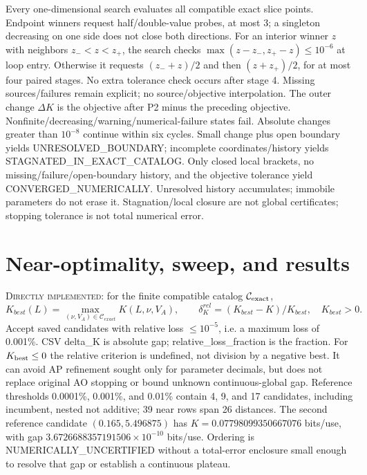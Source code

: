 \documentclass[11pt]{article}
\newcommand{\DI}{\textsc{Directly implemented}}
\begin{document}
Every one-dimensional search evaluates all compatible exact slice points.
Endpoint winners request half/double-value probes, at most 3;
a singleton decreasing on one side does not close both directions.
For an interior winner $z$ with neighbors $z_-<z<z_+$, the search checks
$\max(z-z_-,z_+-z)\le10^{-6}$ at loop entry.
Otherwise it requests $(z_-+z)/2$ and then $(z+z_+)/2$, for at most four paired stages.
No extra tolerance check occurs after stage 4.
Missing sources/failures remain explicit; no source/objective interpolation.
The outer change $\Delta K$ is the objective after P2 minus the preceding objective.
Nonfinite/decreasing/warning/numerical-failure states fail.
Absolute changes greater than $10^{-8}$ continue within six cycles.
Small change plus open boundary yields UNRESOLVED\_BOUNDARY;
incomplete coordinates/history yields STAGNATED\_IN\_EXACT\_CATALOG.
Only closed local brackets, no missing/failure/open-boundary history, and the objective
tolerance yield CONVERGED\_NUMERICALLY.
Unresolved history accumulates; immobile parameters do not erase it.
Stagnation/local closure are not global certificates; stopping tolerance is
not total numerical error.

\section{Near-optimality, sweep, and results}
\DI: for the finite compatible catalog $\mathcal C_{\rm exact}$,
\begin{equation}
K_{best}(L)=\max_{(\nu,V_A)\in\mathcal C_{exact}}K(L,\nu,V_A),\qquad
\delta_K^{rel}=(K_{best}-K)/K_{best},\quad K_{best}>0.
\end{equation}
Accept saved candidates with relative loss $\le10^{-5}$, i.e. a maximum loss of 0.001\%.
CSV delta\_K is absolute gap; relative\_loss\_fraction is the fraction.
For $K_{\rm best}\le0$ the relative criterion is undefined, not division by a negative best.
It can avoid AP refinement sought only for parameter decimals, but does not
replace original AO stopping or bound unknown continuous-global gap.
Reference thresholds 0.0001\%, 0.001\%, and 0.01\% contain 4, 9, and 17 candidates,
including incumbent, nested not additive; 39 near rows span 26 distances.
The second reference candidate $(0.165,5.496875)$ has
$K=0.07798099350667076$ bits/use, with gap
$3.6726688357191506\times10^{-10}$ bits/use.
Ordering is NUMERICALLY\_UNCERTIFIED without a total-error enclosure small
enough to resolve that gap or establish a continuous plateau.
\end{document}

